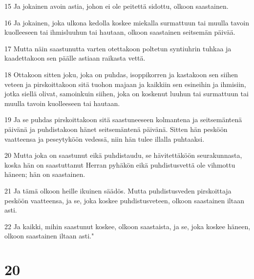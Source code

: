 \par 15 Ja jokainen avoin astia, johon ei ole peitettä sidottu, olkoon saastainen.
\par 16 Ja jokainen, joka ulkona kedolla koskee miekalla surmattuun tai muulla tavoin kuolleeseen tai ihmisluuhun tai hautaan, olkoon saastainen seitsemän päivää.
\par 17 Mutta näin saastunutta varten otettakoon poltetun syntiuhrin tuhkaa ja kaadettakoon sen päälle astiaan raikasta vettä.
\par 18 Ottakoon sitten joku, joka on puhdas, isoppikorren ja kastakoon sen siihen veteen ja pirskoittakoon sitä tuohon majaan ja kaikkiin sen esineihin ja ihmisiin, jotka siellä olivat, samoinkuin siihen, joka on koskenut luuhun tai surmattuun tai muulla tavoin kuolleeseen tai hautaan.
\par 19 Ja se puhdas pirskoittakoon sitä saastuneeseen kolmantena ja seitsemäntenä päivänä ja puhdistakoon hänet seitsemäntenä päivänä. Sitten hän pesköön vaatteensa ja peseytyköön vedessä, niin hän tulee illalla puhtaaksi.
\par 20 Mutta joka on saastunut eikä puhdistaudu, se hävitettäköön seurakunnasta, koska hän on saastuttanut Herran pyhäkön eikä puhdistusvettä ole vihmottu häneen; hän on saastainen.
\par 21 Ja tämä olkoon heille ikuinen säädös. Mutta puhdistusveden pirskoittaja pesköön vaatteensa, ja se, joka koskee puhdistusveteen, olkoon saastainen iltaan asti.
\par 22 Ja kaikki, mihin saastunut koskee, olkoon saastaista, ja se, joka koskee häneen, olkoon saastainen iltaan asti."

\chapter{20}

